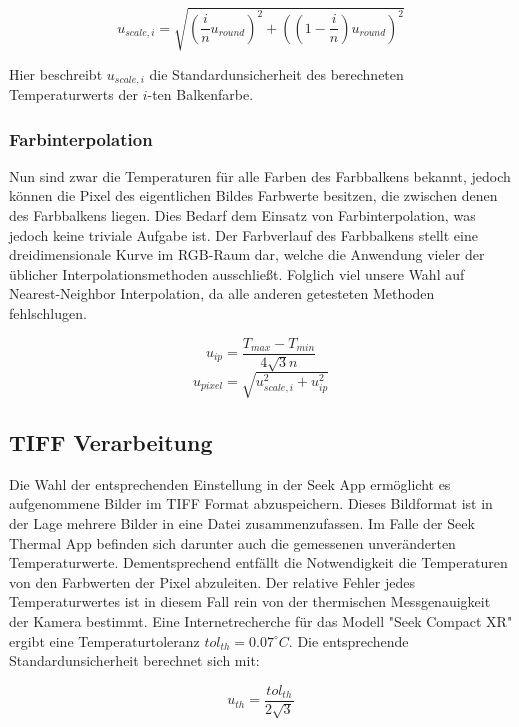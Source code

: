 \documentclass[10pt,a4paper,german]{article}
\begin{document}
\begin{equation}
    u_{scale,i} = \sqrt{\left(\frac{i}{n} u_{round} \right)^2 + \left(\left(1 - \frac{i}{n}\right) u_{round}\right)^2}
\end{equation}

Hier beschreibt $u_{scale,i}$ die Standardunsicherheit des berechneten Temperaturwerts der $i$-ten Balkenfarbe.

\subsubsection{Farbinterpolation}
Nun sind zwar die Temperaturen für alle Farben des Farbbalkens bekannt, jedoch können die Pixel des eigentlichen Bildes Farbwerte besitzen, die zwischen denen des Farbbalkens liegen.
Dies Bedarf dem Einsatz von Farbinterpolation, was jedoch keine triviale Aufgabe ist.
Der Farbverlauf des Farbbalkens stellt eine dreidimensionale Kurve im RGB-Raum dar, welche die Anwendung vieler der üblicher Interpolationsmethoden ausschließt.
Folglich viel unsere Wahl auf Nearest-Neighbor Interpolation, da alle anderen getesteten Methoden fehlschlugen.

\begin{equation}
    u_{ip} = \frac{T_{max} - T_{min}}{4\sqrt{3}n}
\end{equation}
\begin{equation}
    u_{pixel} = \sqrt{u_{scale,i}^2 + u_{ip}^2}
\end{equation}

\subsection{TIFF Verarbeitung}
Die Wahl der entsprechenden Einstellung in der Seek App ermöglicht es aufgenommene Bilder im TIFF Format abzuspeichern. 
Dieses Bildformat ist in der Lage mehrere Bilder in eine Datei zusammenzufassen.
Im Falle der Seek Thermal App befinden sich darunter auch die gemessenen unveränderten Temperaturwerte.
Dementsprechend entfällt die Notwendigkeit die Temperaturen von den Farbwerten der Pixel abzuleiten.
Der relative Fehler jedes Temperaturwertes ist in diesem Fall rein von der thermischen Messgenauigkeit der Kamera bestimmt.
Eine Internetrecherche für das Modell "Seek Compact XR" ergibt eine Temperaturtoleranz $tol_{th} = 0.07 ^{\circ}C$.
Die entsprechende Standardunsicherheit berechnet sich mit:

\begin{equation}
    u_{th} = \frac{tol_{th}}{2\sqrt{3}}
\end{equation}
\end{document}
